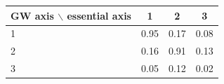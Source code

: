 \begin{tabular}{lccc}
\toprule
GW axis $\backslash$ essential axis & 1 & 2 & 3 \\
\midrule
1 & 0.95 & 0.17 & 0.08 \\
2 & 0.16 & 0.91 & 0.13 \\
3 & 0.05 & 0.12 & 0.02 \\
\bottomrule
\end{tabular}